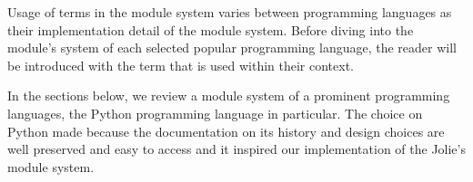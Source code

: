 Usage of terms in the module system varies between programming languages as their implementation detail of the module system. Before diving into the module's system of each selected popular programming language, the reader will be introduced with the term that is used within their context.

In the sections below, we review a module system of a prominent programming languages, the Python programming language in particular. The choice on Python made because the documentation on its history and design choices are well preserved and easy to access and it inspired our implementation of the Jolie's module system.


